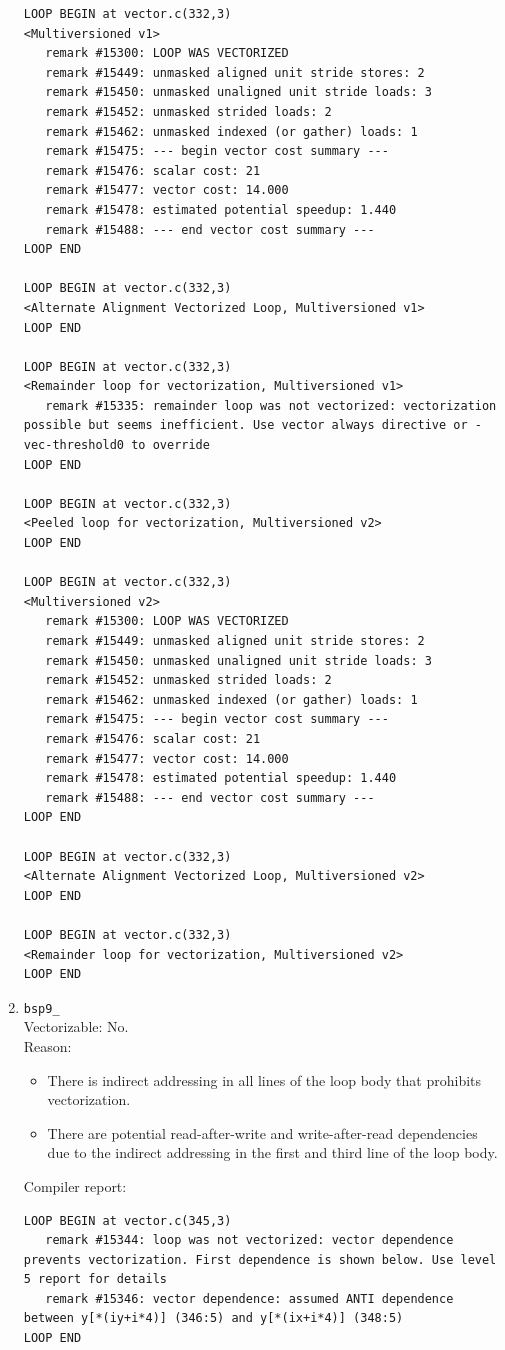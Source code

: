 \documentclass[11pt]{article}
\begin{document}
\begin{enumerate}
\begin{lstlisting}
LOOP BEGIN at vector.c(332,3)
<Multiversioned v1>
   remark #15300: LOOP WAS VECTORIZED
   remark #15449: unmasked aligned unit stride stores: 2 
   remark #15450: unmasked unaligned unit stride loads: 3 
   remark #15452: unmasked strided loads: 2 
   remark #15462: unmasked indexed (or gather) loads: 1 
   remark #15475: --- begin vector cost summary ---
   remark #15476: scalar cost: 21 
   remark #15477: vector cost: 14.000 
   remark #15478: estimated potential speedup: 1.440 
   remark #15488: --- end vector cost summary ---
LOOP END

LOOP BEGIN at vector.c(332,3)
<Alternate Alignment Vectorized Loop, Multiversioned v1>
LOOP END

LOOP BEGIN at vector.c(332,3)
<Remainder loop for vectorization, Multiversioned v1>
   remark #15335: remainder loop was not vectorized: vectorization possible but seems inefficient. Use vector always directive or -vec-threshold0 to override 
LOOP END

LOOP BEGIN at vector.c(332,3)
<Peeled loop for vectorization, Multiversioned v2>
LOOP END

LOOP BEGIN at vector.c(332,3)
<Multiversioned v2>
   remark #15300: LOOP WAS VECTORIZED
   remark #15449: unmasked aligned unit stride stores: 2 
   remark #15450: unmasked unaligned unit stride loads: 3 
   remark #15452: unmasked strided loads: 2 
   remark #15462: unmasked indexed (or gather) loads: 1 
   remark #15475: --- begin vector cost summary ---
   remark #15476: scalar cost: 21 
   remark #15477: vector cost: 14.000 
   remark #15478: estimated potential speedup: 1.440 
   remark #15488: --- end vector cost summary ---
LOOP END

LOOP BEGIN at vector.c(332,3)
<Alternate Alignment Vectorized Loop, Multiversioned v2>
LOOP END

LOOP BEGIN at vector.c(332,3)
<Remainder loop for vectorization, Multiversioned v2>
LOOP END
\end{lstlisting}

\item \texttt{bsp9\_}\\
Vectorizable: No.\\
Reason:
\begin{itemize}
\item There is indirect addressing in all lines of the loop body that prohibits vectorization.
\item There are potential read-after-write and write-after-read dependencies due to the indirect addressing in the first and third line of the loop body.
\end{itemize}
Compiler report:
\begin{lstlisting}
LOOP BEGIN at vector.c(345,3)
   remark #15344: loop was not vectorized: vector dependence prevents vectorization. First dependence is shown below. Use level 5 report for details
   remark #15346: vector dependence: assumed ANTI dependence between y[*(iy+i*4)] (346:5) and y[*(ix+i*4)] (348:5)
LOOP END
\end{lstlisting}


\end{enumerate}
\end{document}
